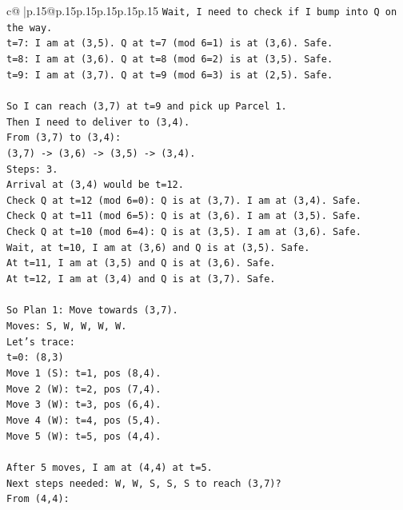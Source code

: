 \documentclass{article}
\begin{document}
{\begin{supertabular}{c@{$\;$}|p{.15\linewidth}@{}p{.15\linewidth}p{.15\linewidth}p{.15\linewidth}p{.15\linewidth}p{.15\linewidth}}
{{{\texttt{Wait, I need to check if I bump into Q on the way.} \\
\texttt{t=7: I am at (3,5). Q at t=7 (mod 6=1) is at (3,6). Safe.} \\
\texttt{t=8: I am at (3,6). Q at t=8 (mod 6=2) is at (3,5). Safe.} \\
\texttt{t=9: I am at (3,7). Q at t=9 (mod 6=3) is at (2,5). Safe.} \\
\\ 
\texttt{So I can reach (3,7) at t=9 and pick up Parcel 1.} \\
\texttt{Then I need to deliver to (3,4).} \\
\texttt{From (3,7) to (3,4):} \\
\texttt{(3,7) {-}> (3,6) {-}> (3,5) {-}> (3,4).} \\
\texttt{Steps: 3.} \\
\texttt{Arrival at (3,4) would be t=12.} \\
\texttt{Check Q at t=12 (mod 6=0): Q is at (3,7). I am at (3,4). Safe.} \\
\texttt{Check Q at t=11 (mod 6=5): Q is at (3,6). I am at (3,5). Safe.} \\
\texttt{Check Q at t=10 (mod 6=4): Q is at (3,5). I am at (3,6). Safe.} \\
\texttt{Wait, at t=10, I am at (3,6) and Q is at (3,5). Safe.} \\
\texttt{At t=11, I am at (3,5) and Q is at (3,6). Safe.} \\
\texttt{At t=12, I am at (3,4) and Q is at (3,7). Safe.} \\
\\ 
\texttt{So Plan 1: Move towards (3,7).} \\
\texttt{Moves: S, W, W, W, W.} \\
\texttt{Let's trace:} \\
\texttt{t=0: (8,3)} \\
\texttt{Move 1 (S): t=1, pos (8,4).} \\
\texttt{Move 2 (W): t=2, pos (7,4).} \\
\texttt{Move 3 (W): t=3, pos (6,4).} \\
\texttt{Move 4 (W): t=4, pos (5,4).} \\
\texttt{Move 5 (W): t=5, pos (4,4).} \\
\\ 
\texttt{After 5 moves, I am at (4,4) at t=5.} \\
\texttt{Next steps needed: W, W, S, S, S to reach (3,7)?} \\
\texttt{From (4,4):} \\
}}}
\end{supertabular}}
\end{document}
